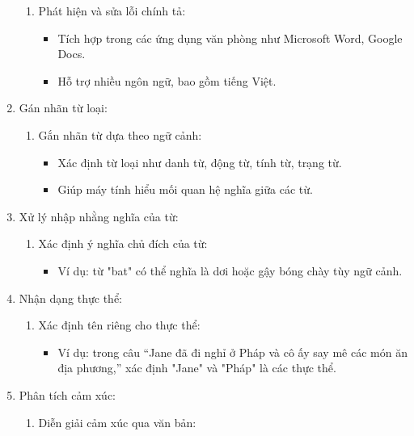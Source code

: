 \begin{enumerate}
        \begin{enumerate}
            \item Phát hiện và sửa lỗi chính tả:
            \begin{itemize}
                \item Tích hợp trong các ứng dụng văn phòng như Microsoft Word, Google Docs.
                \item Hỗ trợ nhiều ngôn ngữ, bao gồm tiếng Việt.
            \end{itemize}
        \end{enumerate}
        \item Gán nhãn từ loại:
        \begin{enumerate}
            \item Gắn nhãn từ dựa theo ngữ cảnh:
            \begin{itemize}
                \item Xác định từ loại như danh từ, động từ, tính từ, trạng từ.
                \item Giúp máy tính hiểu mối quan hệ nghĩa giữa các từ.
            \end{itemize}
        \end{enumerate}
        \item Xử lý nhập nhằng nghĩa của từ:
        \begin{enumerate}
            \item Xác định ý nghĩa chủ đích của từ:
            \begin{itemize}
                \item Ví dụ: từ "bat" có thể nghĩa là dơi hoặc gậy bóng chày tùy ngữ cảnh.
            \end{itemize}
        \end{enumerate}
        \clearpage
        \item Nhận dạng thực thể:
        \begin{enumerate}
            \item Xác định tên riêng cho thực thể:
            \begin{itemize}
                \item Ví dụ: trong câu “Jane đã đi nghỉ ở Pháp và cô ấy say mê các món ăn địa phương,” xác định "Jane" và "Pháp" là các thực thể.
            \end{itemize}
        \end{enumerate}
        \item Phân tích cảm xúc:
        \begin{enumerate}
            \item Diễn giải cảm xúc qua văn bản:

\end{enumerate}
\end{enumerate}
